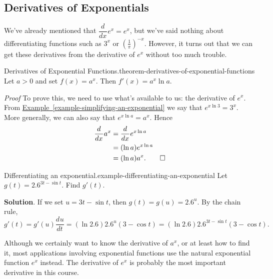 \documentclass[10pt,]{book}
\makeatletter
\renewcommand*{\proofname}{Proof}
\renewenvironment{proof}[1][\proofname]{\par
  \pushQED{\qed}%
  \normalfont \topsep6\p@\@plus6\p@\relax
  \trivlist
  \item\relax
    {\itshape
    #1\@addpunct{.}}\hspace\labelsep\ignorespaces
}{%
  \popQED\endtrivlist\@endpefalse
}
\numberwithin{equation}{section}
\newcommand{\dv}[3][]{\dfrac{d^{#1} #2}{d #3^{#1}}}
\makeatother
\begin{document}
\subsection[{Derivatives of Exponentials}]{Derivatives of Exponentials}\label{subsection-derivatives-of-exponentials}
\hypertarget{p-226}{}%
We've already mentioned that \(\dv{}{x}e^{x} = e^{x}\), but we've said nothing about differentiating functions such as \(3^{x}\) or \((\frac{1}{\pi})^{-x}\). However, it turns out that we can get these derivatives from the derivative of \(e^{x}\) without too much trouble.%
\begin{theorem}{Derivatives of Exponential Functions.}{}{theorem-derivatives-of-exponential-functions}%
\hypertarget{p-227}{}%
Let \(a > 0\) and set \(f(x) = a^{x}\). Then \(f'(x) = a^{x}\ln a\).%
\end{theorem}
\begin{proof}\hypertarget{proof-5}{}
\hypertarget{p-228}{}%
To prove this, we need to use what's available to us: the derivative of \(e^{x}\). From \hyperref[example-simplifying-an-exponential]{Example~\ref{example-simplifying-an-exponential}} we say that \(e^{x\ln 3} = 3^{x}\). More generally, we can also say that \(e^{x\ln a} = a^{x}\). Hence%
\begin{align*}
\dv{}{x}a^{x} & = \dv{}{x}e^{x\ln a} \\
& = (\ln a)e^{x\ln a} \\
& = (\ln a)a^{x}. \qedhere
\end{align*}
%
\end{proof}
\begin{example}{Differentiating an exponential.}{example-differentiating-an-exponential}%
\hypertarget{p-229}{}%
Let \(g(t) = 2.6^{3t - \sin t}\). Find \(g'(t)\).%
\par\smallskip%
\noindent\textbf{Solution}.\hypertarget{solution-49}{}\quad%
\hypertarget{p-230}{}%
If we set \(u = 3t - \sin t\), then \(g(t) = g(u) = 2.6^{u}\). By the chain rule, \(g'(t) = g'(u)\dv{u}{t} = (\ln2.6)2.6^{u}(3-\cos t) = (\ln2.6)2.6^{3t-\sin t}(3-\cos t).\)%
\end{example}
\hypertarget{p-231}{}%
Although we certainly want to know the derivative of \(a^{x}\), or at least how to find it, most applications involving exponential functions use the natural exponential function \(e^{x}\) instead. The derivative of \(e^{x}\) is probably the most important derivative in this course.%
\end{document}
